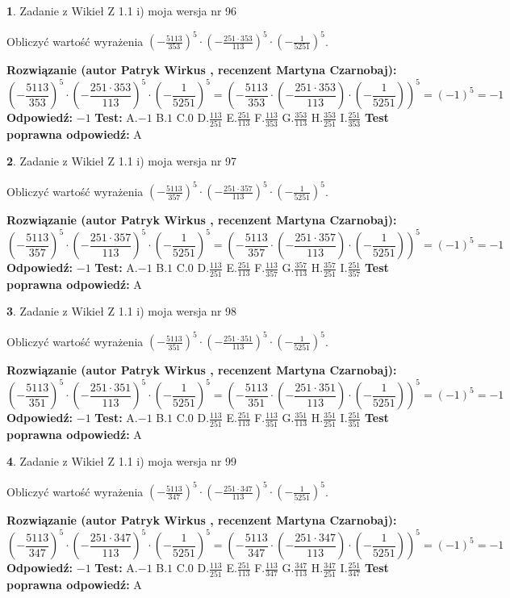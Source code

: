 \documentclass[12pt, a4paper]{article}
\theoremstyle{definition} %
\newtheorem{zad}{}
\newcommand{\zadStart}[1]{\begin{zad}#1\newline}
\newcommand{\zadStop}{\end{zad}}
\newcommand{\rozwStart}[2]{\noindent \textbf{Rozwiązanie (autor #1 , recenzent #2): }\newline}
\newcommand{\rozwStop}{\newline}
\newcommand{\odpStart}{\noindent \textbf{Odpowiedź:}\newline}
\newcommand{\odpStop}{\newline}
\newcommand{\testStart}{\noindent \textbf{Test:}\newline}
\newcommand{\testStop}{\newline}
\newcommand{\kluczStart}{\noindent \textbf{Test poprawna odpowiedź:}\newline}
\newcommand{\kluczStop}{\newline}
\begin{document}
\zadStart{Zadanie z Wikieł Z 1.1 i) moja wersja nr 96}

Obliczyć wartość wyrażenia $(-\frac{5113}{353})^{5} \cdot (-\frac{251 \cdot 353}{113})^{5} \cdot (-\frac{1}{5251})^{5}$.
\zadStop
\rozwStart{Patryk Wirkus}{Martyna Czarnobaj}
$$(-\frac{5113}{353})^{5} \cdot (-\frac{251 \cdot 353}{113})^{5} \cdot (-\frac{1}{5251})^{5} = (-\frac{5113}{353} \cdot (-\frac{251 \cdot 353}{113}) \cdot (-\frac{1}{5251}))^{5} = (-1)^{5} = -1$$
\rozwStop
\odpStart
$-1$
\odpStop
\testStart
A.$-1$ B.$1$ C.$0$ D.$\frac{113}{251}$ E.$\frac{251}{113}$
F.$\frac{113}{353}$ G.$\frac{353}{113}$
H.$\frac{353}{251}$
I.$\frac{251}{353}$
\testStop
\kluczStart
A
\kluczStop



\zadStart{Zadanie z Wikieł Z 1.1 i) moja wersja nr 97}

Obliczyć wartość wyrażenia $(-\frac{5113}{357})^{5} \cdot (-\frac{251 \cdot 357}{113})^{5} \cdot (-\frac{1}{5251})^{5}$.
\zadStop
\rozwStart{Patryk Wirkus}{Martyna Czarnobaj}
$$(-\frac{5113}{357})^{5} \cdot (-\frac{251 \cdot 357}{113})^{5} \cdot (-\frac{1}{5251})^{5} = (-\frac{5113}{357} \cdot (-\frac{251 \cdot 357}{113}) \cdot (-\frac{1}{5251}))^{5} = (-1)^{5} = -1$$
\rozwStop
\odpStart
$-1$
\odpStop
\testStart
A.$-1$ B.$1$ C.$0$ D.$\frac{113}{251}$ E.$\frac{251}{113}$
F.$\frac{113}{357}$ G.$\frac{357}{113}$
H.$\frac{357}{251}$
I.$\frac{251}{357}$
\testStop
\kluczStart
A
\kluczStop



\zadStart{Zadanie z Wikieł Z 1.1 i) moja wersja nr 98}

Obliczyć wartość wyrażenia $(-\frac{5113}{351})^{5} \cdot (-\frac{251 \cdot 351}{113})^{5} \cdot (-\frac{1}{5251})^{5}$.
\zadStop
\rozwStart{Patryk Wirkus}{Martyna Czarnobaj}
$$(-\frac{5113}{351})^{5} \cdot (-\frac{251 \cdot 351}{113})^{5} \cdot (-\frac{1}{5251})^{5} = (-\frac{5113}{351} \cdot (-\frac{251 \cdot 351}{113}) \cdot (-\frac{1}{5251}))^{5} = (-1)^{5} = -1$$
\rozwStop
\odpStart
$-1$
\odpStop
\testStart
A.$-1$ B.$1$ C.$0$ D.$\frac{113}{251}$ E.$\frac{251}{113}$
F.$\frac{113}{351}$ G.$\frac{351}{113}$
H.$\frac{351}{251}$
I.$\frac{251}{351}$
\testStop
\kluczStart
A
\kluczStop



\zadStart{Zadanie z Wikieł Z 1.1 i) moja wersja nr 99}

Obliczyć wartość wyrażenia $(-\frac{5113}{347})^{5} \cdot (-\frac{251 \cdot 347}{113})^{5} \cdot (-\frac{1}{5251})^{5}$.
\zadStop
\rozwStart{Patryk Wirkus}{Martyna Czarnobaj}
$$(-\frac{5113}{347})^{5} \cdot (-\frac{251 \cdot 347}{113})^{5} \cdot (-\frac{1}{5251})^{5} = (-\frac{5113}{347} \cdot (-\frac{251 \cdot 347}{113}) \cdot (-\frac{1}{5251}))^{5} = (-1)^{5} = -1$$
\rozwStop
\odpStart
$-1$
\odpStop
\testStart
A.$-1$ B.$1$ C.$0$ D.$\frac{113}{251}$ E.$\frac{251}{113}$
F.$\frac{113}{347}$ G.$\frac{347}{113}$
H.$\frac{347}{251}$
I.$\frac{251}{347}$
\testStop
\kluczStart
A
\kluczStop
\end{document}
